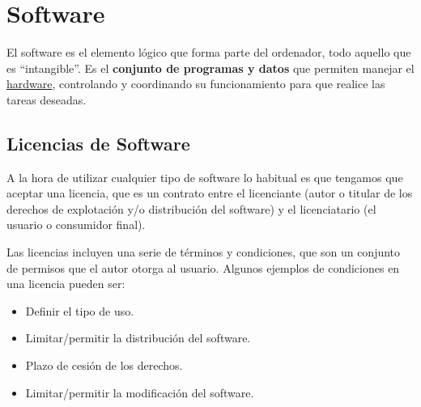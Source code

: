 \chapter{Software}
El software es el elemento lógico que forma parte del ordenador, todo aquello que es “intangible”. Es el \textbf{conjunto de programas y datos} que permiten manejar el \hyperlink{hardware}{hardware}, controlando y coordinando su funcionamiento para que realice las tareas deseadas.




\section{Licencias de Software}
A la hora de utilizar cualquier tipo de software lo habitual es que tengamos que aceptar una licencia, que es un contrato entre el licenciante (autor o titular de los derechos de explotación y/o distribución del software) y el licenciatario (el usuario o consumidor final).

Las licencias incluyen una serie de términos y condiciones, que son un conjunto de permisos que el autor otorga al usuario. Algunos ejemplos de condiciones en una licencia pueden ser:

\begin{itemize}
    \item Definir el tipo de uso.
    \item Limitar/permitir la distribución del software.
    \item Plazo de cesión de los derechos.
    \item Limitar/permitir la modificación del software.
\end{itemize}

